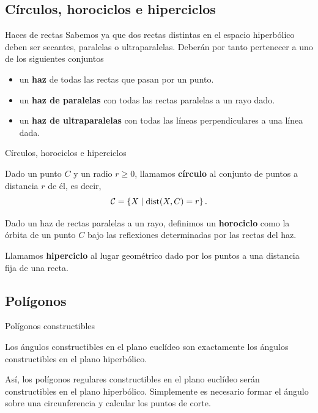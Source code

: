\documentclass[compress]{beamer}
\begin{document}
\subsection{Círculos, horociclos e hiperciclos}
\begin{frame}{Haces de rectas}
  Sabemos ya que dos rectas distintas en el espacio hiperbólico
  deben ser secantes, paralelas o ultraparalelas. Deberán por tanto
  pertenecer a uno de los siguientes conjuntos

  \begin{itemize}
  \item un \textbf{haz} de todas las rectas que pasan por un punto.
  \item un \textbf{haz de paralelas} con todas las rectas paralelas a un
    rayo dado.
  \item un \textbf{haz de ultraparalelas} con todas las líneas
    perpendiculares a una línea dada.
  \end{itemize}
\end{frame}

\begin{frame}{Círculos, horociclos e hiperciclos}
  \begin{definition}[Círculo]
    Dado un punto $C$ y un radio $r \geq 0$, llamamos \textbf{círculo}
    al conjunto de puntos a distancia $r$ de él, es decir,
    \[{\cal C} = \left\{ X \mid \mathrm{dist}(X,C) = r \right\}.\]
  \end{definition}

  \begin{definition}[Horociclo]
    Dado un haz de rectas paralelas a un rayo, definimos un \textbf{horociclo} como
    la órbita de un punto $C$ bajo las reflexiones determinadas por las rectas del
    haz. \cite{coxeter}
  \end{definition}

  \begin{definition}[Hiperciclo]
    Llamamos \textbf{hiperciclo} al lugar geométrico dado por los puntos a
    una distancia fija de una recta.
  \end{definition}
\end{frame}


\subsection{Polígonos}
\begin{frame}{Polígonos constructibles}
  \begin{theorem}
    Los ángulos constructibles en el plano euclídeo son exactamente los ángulos
    constructibles en el plano hiperbólico. \cite{jagy95}
  \end{theorem}
  
  Así, los polígonos regulares constructibles en el plano euclídeo serán
  constructibles en el plano hiperbólico. Simplemente es necesario
  formar el ángulo sobre una circunferencia y calcular los puntos de corte.
\end{frame}
\end{document}
